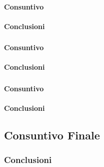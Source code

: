 \documentclass[./PianoDiProgetto.tex]{subfiles}
\begin{document}
  \paragraph{Consuntivo}

  \paragraph{Conclusioni}

\subsubsection{\PerC}

  \paragraph{Consuntivo}

  \paragraph{Conclusioni}

\subsubsection{\PerV}

  \paragraph{Consuntivo}

  \paragraph{Conclusioni}

\subsection{Consuntivo Finale}

  \subsubsection{Conclusioni}
\end{document}
